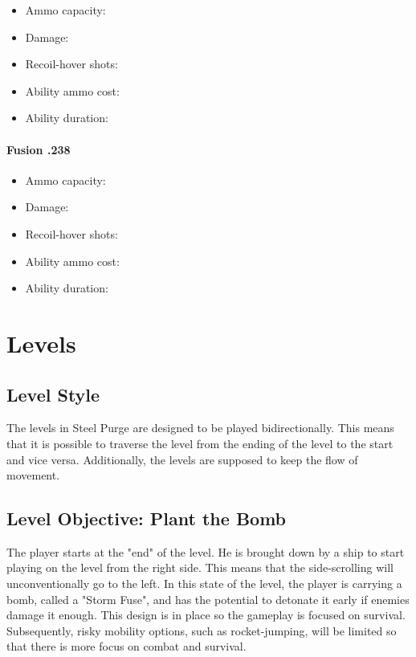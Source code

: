 \documentclass[12pt]{article}
\begin{document}
\begin{itemize}
	\item Ammo capacity: 
	\item Damage: 
	\item Recoil-hover shots: 
	\item Ability ammo cost: 
	\item Ability duration: 
\end{itemize}

\paragraph{Fusion .238}

\begin{itemize}
	\item Ammo capacity: 
	\item Damage: 
	\item Recoil-hover shots: 
	\item Ability ammo cost: 
	\item Ability duration: 
\end{itemize}

\section{Levels}

\subsection{Level Style}

The levels in Steel Purge are designed to be played bidirectionally. This means that it is possible to traverse the level from the ending of the level to the start and vice versa. Additionally, the levels are supposed to keep the flow of movement. 

\subsection{Level Objective: Plant the Bomb}

The player starts at the "end" of the level. He is brought down by a ship to start playing on the level from the right side. This means that the side-scrolling will unconventionally go to the left. In this state of the level, the player is carrying a bomb, called a "Storm Fuse", and has the potential to detonate it early if enemies damage it enough. This design is in place so the gameplay is focused on survival. Subsequently, risky mobility options, such as rocket-jumping, will be limited so that there is more focus on combat and survival. 
\end{document}
